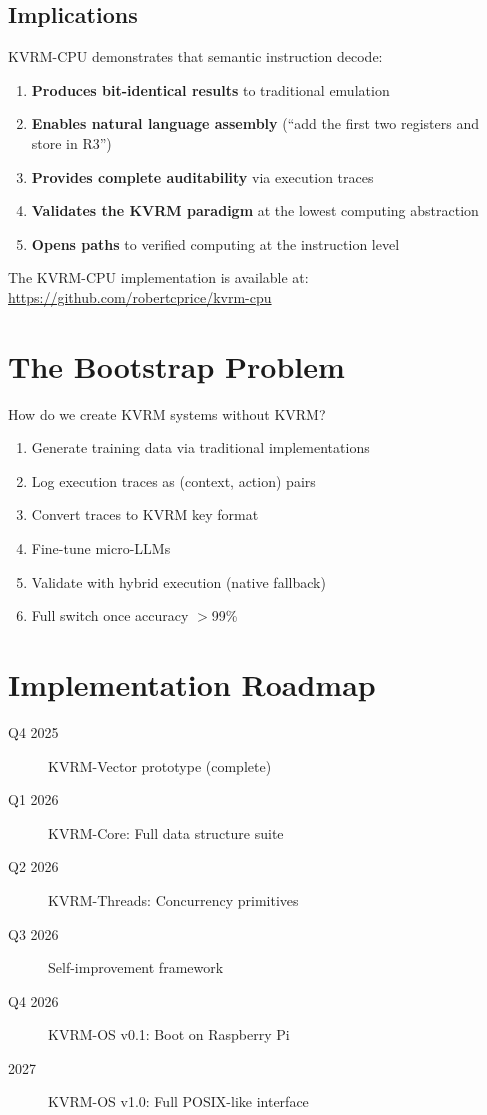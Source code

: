 \documentclass[11pt,a4paper]{article}
\begin{document}
\subsection{Implications}

KVRM-CPU demonstrates that semantic instruction decode:
\begin{enumerate}
    \item \textbf{Produces bit-identical results} to traditional emulation
    \item \textbf{Enables natural language assembly} (``add the first two registers and store in R3'')
    \item \textbf{Provides complete auditability} via execution traces
    \item \textbf{Validates the KVRM paradigm} at the lowest computing abstraction
    \item \textbf{Opens paths} to verified computing at the instruction level
\end{enumerate}

The KVRM-CPU implementation is available at: \url{https://github.com/robertcprice/kvrm-cpu}

\section{The Bootstrap Problem}

How do we create KVRM systems without KVRM?

\begin{enumerate}
    \item Generate training data via traditional implementations
    \item Log execution traces as (context, action) pairs
    \item Convert traces to KVRM key format
    \item Fine-tune micro-LLMs
    \item Validate with hybrid execution (native fallback)
    \item Full switch once accuracy $>$99\%
\end{enumerate}

\section{Implementation Roadmap}
\label{sec:roadmap}

\begin{description}
    \item[Q4 2025] KVRM-Vector prototype (complete)
    \item[Q1 2026] KVRM-Core: Full data structure suite
    \item[Q2 2026] KVRM-Threads: Concurrency primitives
    \item[Q3 2026] Self-improvement framework
    \item[Q4 2026] KVRM-OS v0.1: Boot on Raspberry Pi
    \item[2027] KVRM-OS v1.0: Full POSIX-like interface
\end{description}
\end{document}
